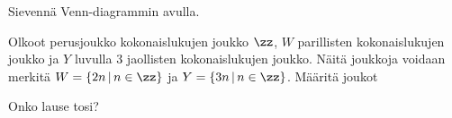 \begin{tehtavasivu}
\begin{tehtava}
%    
    
\end{tehtava}

\begin{tehtava}
     Sievennä Venn-diagrammin avulla.
    \begin{alakohdat}
    \end{alakohdat}

    \begin{vastaus}
    
        \begin{alakohdat}
        \end{alakohdat}
    \end{vastaus}
    
\end{tehtava}

\begin{tehtava}
  Olkoot perusjoukko kokonaislukujen joukko $\zz$, $W$ parillisten kokonaislukujen joukko ja $Y$ luvulla $3$ jaollisten kokonaislukujen joukko. Näitä joukkoja voidaan merkitä $W = \{2n\,|\, n\in\zz\}$ ja $Y = \{3n \,|\, n \in \zz\}$. Määritä joukot   
    \begin{alakohdat}
    \end{alakohdat}

    \begin{vastaus}
    
        \begin{alakohdat}
        \end{alakohdat}
    \end{vastaus}
    
\end{tehtava}

\begin{tehtava}
     Onko lause tosi?
    \begin{alakohdat}
        \alakohta{$-3 \in \nn$}
        \alakohta{$\pi \in \rr \setminus \qq$}
        \alakohta{$\emptyset \subset \zz$}
    \end{alakohdat}


\end{tehtava}
\end{tehtavasivu}
